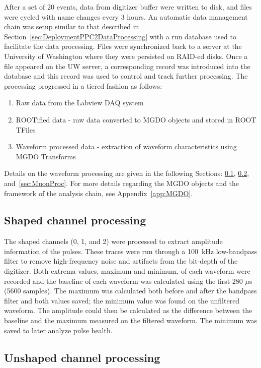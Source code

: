 	After a set of 20 events, data from digitizer buffer were written to disk, and files were cycled with name changes every 3 hours.  An automatic data management chain was setup similar to that described in Section~\ref{sec:DeploymentPPC2DataProcessing} with a run database used to facilitate the data processing.  Files were synchronized back to a server at the University of Washington where they were persisted on RAID-ed disks.  Once a file appeared on the UW server, a corresponding record was introduced into the database and this record was used to control and track further processing.  The processing progressed in a tiered fashion as follows:
		\begin{enumerate}
			\item[Tier 0:]  Raw data from the Labview DAQ system
			\item[Tier 1:]  ROOTified data - raw data converted to MGDO objects and stored in ROOT TFiles
			\item[Tier 2:]  Waveform processed data - extraction of waveform characteristics using MGDO Transforms
		\end{enumerate}
Details on the waveform processing are given in the following Sections: \ref{sec:BegeShapedProc}, \ref{sec:UnshapedWFProc}, and~\ref{sec:MuonProc}.  For more details regarding the MGDO objects and the framework of the analysis chain, see Appendix~\ref{app:MGDO}.
	
		\subsection{Shaped channel processing}
		\label{sec:BegeShapedProc}

The shaped channels (0, 1, and 2) were processed to extract amplitude information of the pulses.  These traces were run through a 100~kHz low-bandpass filter to remove high-frequency noise and artifacts from the bit-depth of the digitizer.  Both extrema values, maximum and minimum, of each waveform were recorded and the baseline of each waveform was calculated using the first 280 $\mu$s (5600 samples).  The maximum was calculated both before and after the bandpass filter and both values saved; the minimum value was found on the unfiltered waveform.  The amplitude could then be calculated as the difference between the baseline and the maximum measured on the filtered waveform.  The minimum was saved to later analyze pulse health.

		\subsection{Unshaped channel processing}
		\label{sec:UnshapedWFProc}

